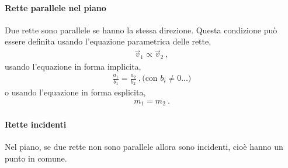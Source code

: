 \documentclass[letterpaper,10pt,english]{jupyterBook}
\begin{document}
\paragraph{Rette parallele nel piano}
\label{\detokenize{ch/analytic_geometry/analytic_geometry_2d/lines:rette-parallele-nel-piano}}
\sphinxAtStartPar
Due rette sono parallele se hanno la stessa direzione. Questa condizione può essere definita usando l’equazione parametrica delle rette,
\begin{equation*}
\begin{split}\vec{v}_1 \propto \vec{v}_2 \ ,\end{split}
\end{equation*}
\sphinxAtStartPar
usando l’equazione in forma implicita,
\begin{equation*}
\begin{split}\frac{a_1}{b_1} = \frac{a_2}{b_2} \ , \text{(con $b_i \ne 0$...)}\end{split}
\end{equation*}
\sphinxAtStartPar
o usando l’equazione in forma esplicita,
\begin{equation*}
\begin{split}m_1 = m_2 \ .\end{split}
\end{equation*}

\paragraph{Rette incidenti}
\label{\detokenize{ch/analytic_geometry/analytic_geometry_2d/lines:rette-incidenti}}
\sphinxAtStartPar
Nel piano, se due rette non sono parallele allora sono incidenti, cioè hanno un punto in comune.
\end{document}
